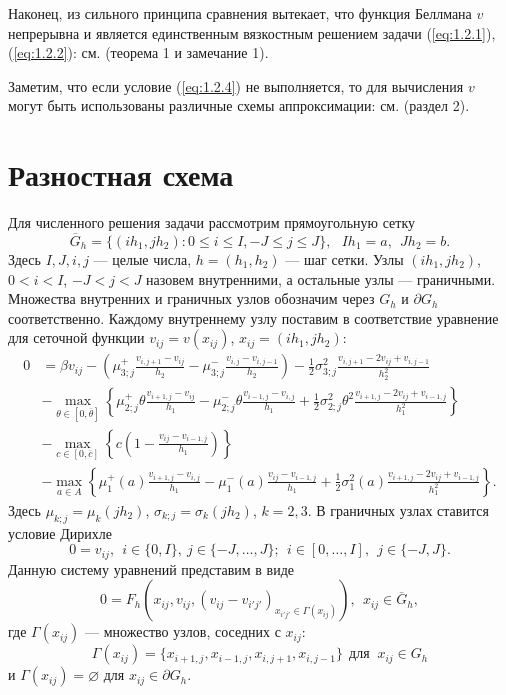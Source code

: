 Наконец, из сильного принципа сравнения вытекает, что функция Беллмана $v$ непрерывна и является единственным вязкостным решением задачи (\ref{eq:1.2.1}), (\ref{eq:1.2.2}): см. \cite{Rok14} (теорема 1 и замечание 1).


Заметим, что если условие (\ref{eq:1.2.4}) не выполняется, то для вычисления $v$ могут быть использованы различные схемы аппроксимации: см. \cite{BarBot98} (раздел 2).

\section{Разностная схема} \label{sect:1.3}
Для численного решения задачи рассмотрим прямоугольную сетку
$$\overline G_h=\{(ih_1,jh_2):0\le i\le I,-J\le j\le J\},\ \ \  Ih_1=a,\ \ Jh_2=b.$$
Здесь $I,J,i,j$ --- целые числа, $h=(h_1,h_2)$ --- шаг сетки. Узлы $(ih_1,jh_2)$, $0<i<I$, $-J<j<J $ назовем внутренними, а остальные узлы --- граничными. Множества внутренних и граничных узлов обозначим через $G_h$ и $\partial G_h$ соответственно. Каждому внутреннему узлу поставим в соответствие уравнение для сеточной функции $v_{ij}=v(x_{ij})$, $x_{ij}=(ih_1,jh_2)$:
\begin{align*}
0 &=\beta v_{ij} -\left(\mu_{3;j}^+ \frac{v_{i,j+1}-v_{ij}}{h_2}-\mu_{3;j}^-\frac{v_{i,j}-v_{i,j-1}}{h_2}\right)-\frac{1}{2}\sigma_{3;j}^2 \frac{v_{i,j+1}-2 v_{ij}+v_{i,j-1}}{h_2^2}  \\
&-\max_{\theta\in [0,\overline\theta]}\left\{\mu_{2;j}^+\theta \frac{v_{i+1,j}-v_{ij}}{h_1} -\mu_{2;j}^- \theta \frac{v_{i-1,j}-v_{i,j}}{h_1} +\frac{1}{2}\sigma_{2;j}^2\theta^2 \frac{v_{i+1,j}-2 v_{ij}+v_{i-1,j}}{h_1^2}\right\}\\
&-\max_{c\in [0,\overline c]} \left\{c\left(1-\frac{v_{ij}-v_{i-1,j}}{h_1}\right)\right\}\\
& -\max_{a\in A}\left\{\mu_1^+(a) \frac{v_{i+1,j}-v_{i,j}}{h_1}-\mu_1^-(a) \frac{v_{ij}-v_{i-1,j}}{h_1}+\frac{1}{2}\sigma_1^2(a)\frac{v_{i+1,j}-2 v_{ij}+v_{i-1,j}}{h_1^2}\right\}.
\end{align*}
Здесь $\mu_{k;j}=\mu_k(jh_2)$, $\sigma_{k;j}=\sigma_k(jh_2)$, $k=2,3$. В граничных узлах  ставится условие Дирихле
$$ 0=v_{ij},\ \ i\in\{0,I\},\ j\in \{-J,\dots,J\};\ \ i\in [0,\dots,I],\ \ j\in\{-J,J\}.$$
Данную систему уравнений представим в виде
\begin{equation} \label{eq:1.3.1}
0=F_h(x_{ij},v_{ij},(v_{ij}-v_{i'j'})_{x_{i'j'}\in\Gamma(x_{ij})}),\ \ x_{ij}\in \overline G_h,
\end{equation}
где $\Gamma(x_{ij})$ --- множество узлов, соседних с $x_{ij}$:
$$\Gamma(x_{ij})=\{x_{i+1,j},x_{i-1,j},x_{i,j+1},x_{i,j-1}\}\ \ \text{для }\ x_{ij}\in G_h$$
и $\Gamma(x_{ij})=\varnothing$ для $x_{ij}\in \partial G_h$.

